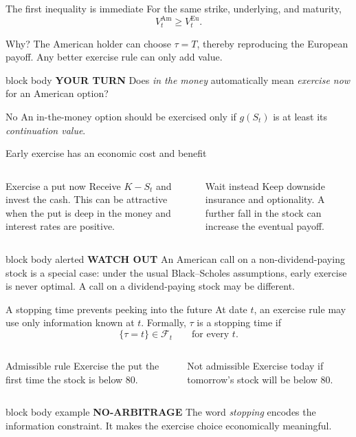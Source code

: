 \documentclass[handout,10pt,aspectratio=169]{beamer}
\newenvironment{marketbox}{\begin{beamercolorbox}[rounded=true,sep=0.7em,wd=\textwidth]{block body example}
  \textbf{\color{CourseGreen}NO-ARBITRAGE}\quad}{\end{beamercolorbox}}
\newenvironment{simplificationbox}{\begin{beamercolorbox}[rounded=true,sep=0.7em,wd=\textwidth]{block body alerted}
  \textbf{\color{CourseRed}WATCH OUT}\quad}{\end{beamercolorbox}}
\newenvironment{pausebox}{\begin{beamercolorbox}[rounded=true,sep=0.8em,wd=\textwidth]{block body}
  \textbf{\color{CourseGold}YOUR TURN}\quad}{\end{beamercolorbox}}
\newcommand{\cF}{\mathcal F}
\begin{document}
\begin{frame}{The first inequality is immediate}
For the same strike, underlying, and maturity,
\[
\boxed{V_t^{\mathrm{Am}}\geq V_t^{\mathrm{Eu}}.}
\]
\begin{block}{Why?}
The American holder can choose \(\tau=T\), thereby reproducing the European
payoff. Any better exercise rule can only add value.
\end{block}
\begin{pausebox}
Does \emph{in the money} automatically mean \emph{exercise now} for an
American option?
\end{pausebox}

\begin{alertblock}{No}
An in-the-money option should be exercised only if \(g(S_t)\) is at least
its \emph{continuation value}.
\end{alertblock}
\end{frame}

\begin{frame}{Early exercise has an economic cost and benefit}
\begin{columns}[T,onlytextwidth]
\begin{block}{Exercise a put now}
Receive \(K-S_t\) and invest the cash. This can be attractive when the put
is deep in the money and interest rates are positive.
\end{block}
\begin{exampleblock}{Wait instead}
Keep downside insurance and optionality. A further fall in the stock can
increase the eventual payoff.
\end{exampleblock}
\end{columns}
\begin{simplificationbox}
An American call on a non-dividend-paying stock is a special case: under the
usual Black--Scholes assumptions, early exercise is never optimal. A call on
a dividend-paying stock may be different.
\end{simplificationbox}
\end{frame}

\begin{frame}{A stopping time prevents peeking into the future}
At date \(t\), an exercise rule may use only information known at \(t\).
Formally, \(\tau\) is a stopping time if
\[
 \{\tau=t\}\in\cF_t \qquad \text{for every }t.
\]
\begin{columns}[T,onlytextwidth]
\begin{exampleblock}{Admissible rule}
Exercise the put the first time the stock is below \(80\).
\end{exampleblock}
\begin{alertblock}{Not admissible}
Exercise today if tomorrow's stock will be below \(80\).
\end{alertblock}
\end{columns}
\begin{marketbox}
The word \emph{stopping} encodes the information constraint. It makes the
exercise choice economically meaningful.
\end{marketbox}
\end{frame}
\end{document}
